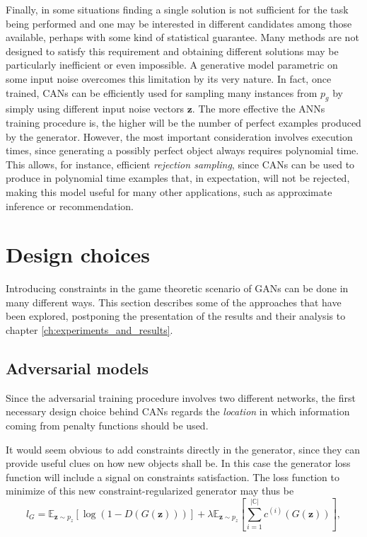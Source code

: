 Finally, in some situations finding a single solution is not sufficient for the task being performed and one may be interested in different candidates among those available, perhaps with some kind of statistical guarantee. Many methods are not designed to satisfy this requirement and obtaining different solutions may be particularly inefficient or even impossible. A generative model parametric on some input noise overcomes this limitation by its very nature. In fact, once trained, CANs can be efficiently used for sampling many instances from $p_g$ by simply using different input noise vectors $\bm{z}$. The more effective the ANNs training procedure is, the higher will be the number of perfect examples produced by the generator. However, the most important consideration involves execution times, since generating a possibly perfect object always requires polynomial time. This allows, for instance, efficient \textit{rejection sampling}, since CANs can be used to produce in polynomial time examples that, in expectation, will not be rejected, making this model useful for many other applications, such as approximate inference or recommendation. 


\section{Design choices}

Introducing constraints in the game theoretic scenario of GANs can be done in many different ways. This section describes some of the approaches that have been explored, postponing the presentation of the results and their analysis to chapter \ref{ch:experiments_and_results}.

\subsection{Adversarial models}

Since the adversarial training procedure involves two different networks, the first necessary design choice behind CANs regards the \textit{location} in which information coming from penalty functions should be used.

It would seem obvious to add constraints directly in the generator, since they can provide useful clues on how new objects shall be. In this case the generator loss function will include a signal on constraints satisfaction. The loss function to minimize of this new constraint-regularized generator may thus be
\[
l_G = \mathbb{E}_{\bm{z} \sim p_z} [\log (1 - D(G(\bm{z})))] + \lambda \mathbb{E}_{\bm{z} \sim p_z} [\sum\limits_{i=1}^{|\mathbb{C}|}c^{(i)}(G(\bm{z}))],
\]

